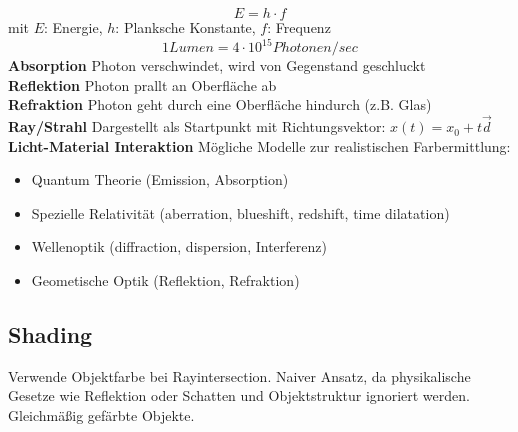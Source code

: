 \documentclass[12pt]{article}
\begin{document}
	$$E = h \cdot f$$
	mit $E$: Energie, $h$: Planksche Konstante, $f$: Frequenz
	$$1 Lumen = 4 \cdot 10^{15} Photonen/sec$$
	\textbf{Absorption} Photon verschwindet, wird von Gegenstand geschluckt\\
	\textbf{Reflektion} Photon prallt an Oberfläche ab\\
	\textbf{Refraktion} Photon geht durch eine Oberfläche hindurch (z.B. Glas)\\
	\textbf{Ray/Strahl} Dargestellt als Startpunkt mit Richtungsvektor: $x(t) = x_0 + t \vec{d}$
	\textbf{Licht-Material Interaktion} Mögliche Modelle zur realistischen Farbermittlung:
	\begin{itemize}
		\item Quantum Theorie (Emission, Absorption)
		\item Spezielle Relativität (aberration, blueshift, redshift, time dilatation)
		\item Wellenoptik (diffraction, dispersion, Interferenz)
		\item Geometische Optik (Reflektion, Refraktion)
	\end{itemize}

	\subsection{Shading}
	Verwende Objektfarbe bei Rayintersection. Naiver Ansatz, da physikalische Gesetze wie Reflektion oder Schatten und Objektstruktur ignoriert werden. Gleichmäßig gefärbte Objekte.
\end{document}
